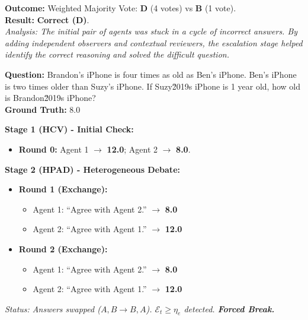 \documentclass[11pt]{article}
\begin{document}
\begin{tcolorbox}
\vspace{4pt}
\textbf{Outcome:} Weighted Majority Vote: \textbf{D} (4 votes) vs \textbf{B} (1 vote). \\
\textbf{Result:} \textcolor{green!60!black}{\textbf{Correct (D)}}. \\
\textit{Analysis: The initial pair of agents was stuck in a cycle of incorrect answers. By adding independent observers and contextual reviewers, the escalation stage helped identify the correct reasoning and solved the difficult question.}
\end{tcolorbox}

\vspace{10pt}

\begin{tcolorbox}[
    enhanced, breakable, width=\linewidth,
    colback=yellow!5, colframe=orange!60!black, %
    title=\textbf{Case 4: Answer Exchange (Loop Detection) - GSM8K ID 40},
    fonttitle=\bfseries\small
]
\textbf{Question:}
Brandon's iPhone is four times as old as Ben's iPhone. Ben's iPhone is two times older than Suzy's iPhone. If Suzy\u2019s iPhone is 1 year old, how old is Brandon\u2019s iPhone?\\
\textbf{Ground Truth:} 8.0

\vspace{4pt}
\textbf{Stage 1 (HCV) - Initial Check:}
\begin{itemize}[leftmargin=1.5em, nosep]
    \item \textbf{Round 0:} Agent 1 $\to$ \textbf{12.0}; Agent 2 $\to$ \textbf{8.0}.
\end{itemize}

\vspace{4pt}
\textbf{Stage 2 (HPAD) - Heterogeneous Debate:}
\begin{itemize}[leftmargin=1.5em, nosep]
    \item \textbf{Round 1 (Exchange):} 
    \begin{itemize}[nosep]
        \item Agent 1: ``Agree with Agent 2.'' $\to$ \textbf{8.0}
        \item Agent 2: ``Agree with Agent 1.'' $\to$ \textbf{12.0}
    \end{itemize}
    \item \textbf{Round 2 (Exchange):} 
    \begin{itemize}[nosep]
        \item Agent 1: ``Agree with Agent 2.'' $\to$ \textbf{8.0}
        \item Agent 2: ``Agree with Agent 1.'' $\to$ \textbf{12.0}
    \end{itemize}
\end{itemize}
\textit{Status: Answers swapped ($A, B \to B, A$). $\mathcal{E}_t \ge \eta_e$ detected. \textbf{Forced Break.}}


\end{tcolorbox}
\end{document}
